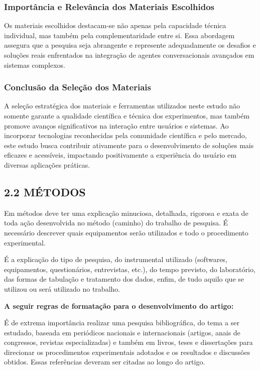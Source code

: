 \documentclass[
]{article}
\begin{document}
\subsubsection{Importância e Relevância dos Materiais
Escolhidos}\label{importuxe2ncia-e-relevuxe2ncia-dos-materiais-escolhidos}

Os materiais escolhidos destacam-se não apenas pela capacidade técnica
individual, mas também pela complementaridade entre si. Essa abordagem
assegura que a pesquisa seja abrangente e represente adequadamente os
desafios e soluções reais enfrentados na integração de agentes
conversacionais avançados em sistemas complexos.

\subsubsection{Conclusão da Seleção dos
Materiais}\label{conclusuxe3o-da-seleuxe7uxe3o-dos-materiais}

A seleção estratégica dos materiais e ferramentas utilizados neste
estudo não somente garante a qualidade científica e técnica dos
experimentos, mas também promove avanços significativos na interação
entre usuários e sistemas. Ao incorporar tecnologias reconhecidas pela
comunidade científica e pelo mercado, este estudo busca contribuir
ativamente para o desenvolvimento de soluções mais eficazes e
acessíveis, impactando positivamente a experiência do usuário em
diversas aplicações práticas.

\subsection{2.2 MÉTODOS}\label{muxe9todos}

Em métodos deve ter uma explicação minuciosa, detalhada, rigorosa e
exata de toda ação desenvolvida no método (caminho) do trabalho de
pesquisa. É necessário descrever quais equipamentos serão utilizados e
todo o procedimento experimental.

É a explicação do tipo de pesquisa, do instrumental utilizado
(softwares, equipamentos, questionários, entrevistas, etc.), do tempo
previsto, do laboratório, das formas de tabulação e tratamento dos
dados, enfim, de tudo aquilo que se utilizou ou será utilizado no
trabalho.

\textbf{A seguir regras de formatação para o desenvolvimento do artigo:}

É de extrema importância realizar uma pesquisa bibliográfica, do tema a
ser estudado, baseada em periódicos nacionais e internacionais (artigos,
anais de congressos, revistas especializadas) e também em livros, teses
e dissertações para direcionar os procedimentos experimentais adotados e
os resultados e discussões obtidos. Essas referências deveram ser
citadas ao longo do artigo.
\end{document}
